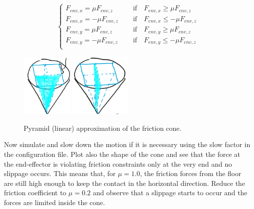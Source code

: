 \documentclass[11pt]{article}
\begin{document}
\begin{equation*}
\begin{cases}
F_{env, x} = \mu F_{env, z}  \quad &\text{   if}\quad F_{env, x} \geq \mu F_{env, z} \\ 
F_{env, x} = -\mu F_{env, z}  \quad &\text{   if}\quad F_{env, x} \leq -\mu F_{env, z} \\ 
F_{env, y} = \mu F_{env, z}  \quad &\text{   if}\quad F_{env, y} \geq \mu F_{env, z} \\ 
F_{env, y} = -\mu F_{env, z}  \quad &\text{   if}\quad F_{env, y} \leq -\mu F_{env, z} \\ 
\end{cases}
\end{equation*}
%
 \begin{figure}[bht]
 	\centering
 	\includegraphics[width=2.5cm]{pics/fcone2.png}
 		\includegraphics[width=3cm]{fcone.png}
 	\caption{Pyramid (linear) approximation of the friction cone.}
 	\label{fig:fcone}
 \end{figure}
Now simulate and slow down the motion if it is necessary using the slow factor in the configuration file. 
Plot also the shape of the cone and  see that the force at the end-effector is violating friction constraints only at the very end and no slippage occurs. This means that, for $\mu = 1.0$, the friction forces from the floor are still high enough to keep the contact in the horizontal direction.  Reduce the friction coefficient to $\mu = 0.2$ and observe that a slippage starts to occur and the forces are limited inside the cone.  
% 
\end{document}
